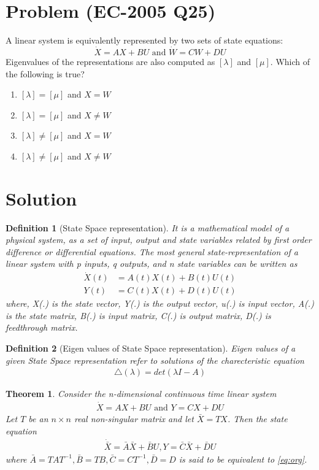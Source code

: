 \documentclass[journal,12pt,twocolumn]{IEEEtran}
\newtheorem{theorem}{Theorem}[section]
\newtheorem{definition}{Definition}[section]
\begin{document}
\section{Problem (EC-2005 Q25)}
A linear system is equivalently represented by two sets of state equations:
$$\dot X=AX+BU \text{ and } \dot W=CW+DU$$
Eigenvalues of the representations are also computed as $[\lambda]$ and $[\mu]$. Which of the following is true?
\begin{enumerate}
    \item $[\lambda]=[\mu]$ and $X=W$
    \item $[\lambda]=[\mu]$ and $X\neq W$
    \item $[\lambda]\neq [\mu]$ and $X=W$
    \item $[\lambda]\neq[\mu]$ and $X\neq W$
\end{enumerate}
\section{Solution}
\begin{definition}[State Space representation]
It is a mathematical model of a physical system, as a set of input, output and state variables related by first order difference or differential equations. The most general state-representation of a linear system with p inputs, q outputs, and n state variables can be written as
\begin{align}
    \dot X(t)&=A(t)X(t)+B(t)U(t)\\
    Y(t)&=C(t)X(t)+D(t)U(t)
\end{align}
where, X(.) is the state vector, Y(.) is the output vector, u(.) is input vector, A(.) is the state matrix, B(.) is input matrix, C(.) is output matrix, D(.) is feedthrough matrix.
\end{definition}
\begin{definition}[Eigen values of State Space representation] 
Eigen values of a given State Space representation refer to solutions of the charecteristic equation
\begin{align}
    \triangle(\lambda)=det(\lambda I-A)
\end{align}
\end{definition}
\begin{theorem}
Consider the n-dimensional continuous time linear system
\begin{align}
    \dot X=AX+BU \text{ and } Y=CX+DU
    \label{eq:org}
\end{align}
Let $T$ be an $n\times n$ real non-singular matrix and let $\bar X= TX$. Then the state equation 
\begin{align}
    \dot{\bar X}=\bar A\bar X+ \bar BU, Y=\bar C\bar X+\bar DU
\end{align}
where $\bar A=TAT^{-1}, \bar B=TB, \bar C=CT^{-1}, \bar D=D$ is said to be equivalent to \eqref{eq:org}.
\label{eq:th1}
\end{theorem}
\end{document}
